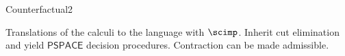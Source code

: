 \begin{entry}{Counterfactual2}
\begin{technicalities}
  Translations of the calculi  to the language
  with $\scimp$. Inherit cut elimination and yield $\mathsf{PSPACE}$
  decision procedures. Contraction can be made admissible.
\end{technicalities}

\end{entry}


